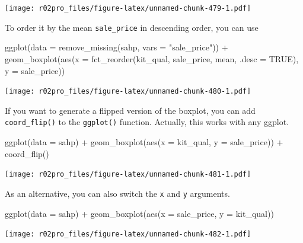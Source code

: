 \documentclass[
]{book}
\newenvironment{Shaded}{\begin{snugshade}}{\end{snugshade}}
\newcommand{\AttributeTok}[1]{\textcolor[rgb]{0.77,0.63,0.00}{#1}}
\newcommand{\ConstantTok}[1]{\textcolor[rgb]{0.00,0.00,0.00}{#1}}
\newcommand{\FunctionTok}[1]{\textcolor[rgb]{0.00,0.00,0.00}{#1}}
\newcommand{\NormalTok}[1]{#1}
\newcommand{\SpecialCharTok}[1]{\textcolor[rgb]{0.00,0.00,0.00}{#1}}
\newcommand{\StringTok}[1]{\textcolor[rgb]{0.31,0.60,0.02}{#1}}
\begin{document}
\texttt{[image: r02pro\_files/figure-latex/unnamed-chunk-479-1.pdf]}

To order it by the mean \texttt{sale\_price} in descending order, you can use

\begin{Shaded}
\begin{Highlighting}[]
\FunctionTok{ggplot}\NormalTok{(}\AttributeTok{data =} \FunctionTok{remove\_missing}\NormalTok{(sahp, }\AttributeTok{vars =} \StringTok{"sale\_price"}\NormalTok{)) }\SpecialCharTok{+} \FunctionTok{geom\_boxplot}\NormalTok{(}\FunctionTok{aes}\NormalTok{(}\AttributeTok{x =} \FunctionTok{fct\_reorder}\NormalTok{(kit\_qual, sale\_price, mean, }\AttributeTok{.desc =} \ConstantTok{TRUE}\NormalTok{), }\AttributeTok{y =}\NormalTok{ sale\_price)) }
\end{Highlighting}
\end{Shaded}

\texttt{[image: r02pro\_files/figure-latex/unnamed-chunk-480-1.pdf]}

If you want to generate a flipped version of the boxplot, you can add \texttt{coord\_flip()} to the \texttt{ggplot()} function. Actually, this works with any ggplot.

\begin{Shaded}
\begin{Highlighting}[]
\FunctionTok{ggplot}\NormalTok{(}\AttributeTok{data =}\NormalTok{ sahp) }\SpecialCharTok{+} \FunctionTok{geom\_boxplot}\NormalTok{(}\FunctionTok{aes}\NormalTok{(}\AttributeTok{x =}\NormalTok{ kit\_qual, }\AttributeTok{y =}\NormalTok{ sale\_price)) }\SpecialCharTok{+}
  \FunctionTok{coord\_flip}\NormalTok{()}
\end{Highlighting}
\end{Shaded}

\texttt{[image: r02pro\_files/figure-latex/unnamed-chunk-481-1.pdf]}

As an alternative, you can also switch the \texttt{x} and \texttt{y} arguments.

\begin{Shaded}
\begin{Highlighting}[]
\FunctionTok{ggplot}\NormalTok{(}\AttributeTok{data =}\NormalTok{ sahp) }\SpecialCharTok{+} \FunctionTok{geom\_boxplot}\NormalTok{(}\FunctionTok{aes}\NormalTok{(}\AttributeTok{x =}\NormalTok{ sale\_price, }\AttributeTok{y =}\NormalTok{ kit\_qual))}
\end{Highlighting}
\end{Shaded}

\texttt{[image: r02pro\_files/figure-latex/unnamed-chunk-482-1.pdf]}
\end{document}
